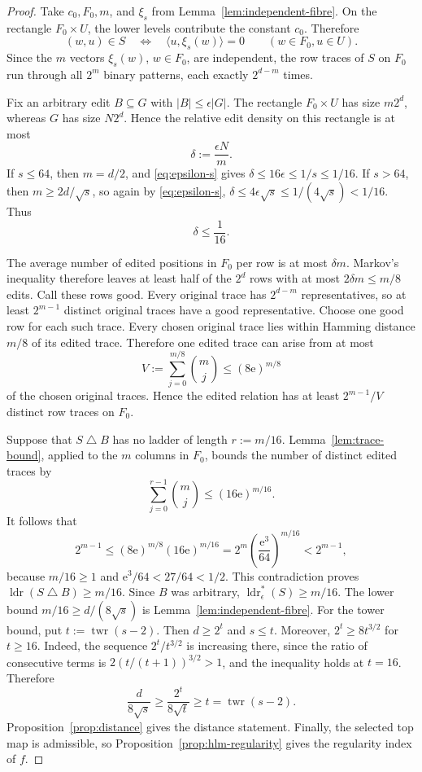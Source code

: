 \documentclass[10pt,a4paper]{amsart}
\numberwithin{theorem}{section}
\newcommand{\inner}[2]{\langle #1,#2\rangle}
\newcommand{\abs}[1]{\lvert #1\rvert}
\newcommand{\twr}{\operatorname{twr}}
\newcommand{\ldr}{\operatorname{ldr}}
\newcommand{\ldrs}{\operatorname{ldr}^{*}}
\newcommand{\econst}{\mathrm e}
\begin{document}
\begin{proof}
Take $c_0,F_0,m$, and $\xi_s$ from Lemma~\ref{lem:independent-fibre}.  On the
rectangle $F_0\times U$, the lower levels contribute the constant $c_0$.
Therefore
\begin{equation}\label{eq:threshold-rectangle}
  (w,u)\in S
  \quad\Longleftrightarrow\quad
  \inner{u}{\xi_s(w)}=0
  \qquad(w\in F_0,u\in U).
\end{equation}
Since the $m$ vectors $\xi_s(w)$, $w\in F_0$, are independent, the row traces
of $S$ on $F_0$ run through all $2^m$ binary patterns, each exactly
$2^{d-m}$ times.

Fix an arbitrary edit $B\subseteq G$ with $\abs B\le\epsilon\abs G$.
The rectangle $F_0\times U$ has size $m2^d$, whereas $G$ has size
$N2^d$.  Hence the relative edit density on this rectangle is at most
\[
  \delta:=\frac{\epsilon N}{m}.
\]
If $s\le64$, then $m=d/2$, and \eqref{eq:epsilon-s} gives
$\delta\le16\epsilon\le1/s\le1/16$.  If $s>64$, then
$m\ge2d/\sqrt{s}$, so again by \eqref{eq:epsilon-s},
$\delta\le4\epsilon\sqrt{s}\le1/(4\sqrt{s})<1/16$.  Thus
\begin{equation}\label{eq:local-edit}
  \delta\le\frac1{16}.
\end{equation}

The average number of edited positions in $F_0$ per row is at most
$\delta m$.  Markov's inequality therefore leaves at least half of the
$2^d$ rows with at most $2\delta m\le m/8$ edits.  Call these rows good.  Every original
trace has $2^{d-m}$ representatives, so at least $2^{m-1}$ distinct original
traces have a good representative.  Choose one good row for each such trace.
Every chosen original trace lies within Hamming distance $m/8$ of its
edited trace.  Therefore one edited trace can arise from at most
\[
  V:=\sum_{j=0}^{m/8}\binom mj
  \le(8\econst)^{m/8}
\]
of the chosen original traces.  Hence the edited relation has at least
$2^{m-1}/V$ distinct row traces on $F_0$.

Suppose that $S\mathbin\triangle B$ has no ladder of length $r:=m/16$.
Lemma~\ref{lem:trace-bound}, applied to the $m$ columns in $F_0$, bounds the
number of distinct edited traces by
\[
  \sum_{j=0}^{r-1}\binom mj\le(16\econst)^{m/16}.
\]
It follows that
\[
  2^{m-1}
  \le(8\econst)^{m/8}(16\econst)^{m/16}
  =2^m\left(\frac{\econst^3}{64}\right)^{m/16}
  <2^{m-1},
\]
because $m/16\ge1$ and $\econst^3/64<27/64<1/2$.  This contradiction proves
$\ldr(S\mathbin\triangle B)\ge m/16$.  Since $B$ was arbitrary,
$\ldrs_\epsilon(S)\ge m/16$.  The lower bound
$m/16\ge d/(8\sqrt{s})$ is Lemma~\ref{lem:independent-fibre}.
For the tower bound, put $t:=\twr(s-2)$.  Then $d\ge2^t$ and $s\le t$.
Moreover, $2^t\ge8t^{3/2}$ for $t\ge16$.  Indeed, the sequence
$2^t/t^{3/2}$ is increasing there, since the ratio of consecutive terms is
$2(t/(t+1))^{3/2}>1$, and the inequality holds at $t=16$.
Therefore
\[
  \frac{d}{8\sqrt{s}}\ge\frac{2^t}{8\sqrt t}\ge t=\twr(s-2).
\]
Proposition~\ref{prop:distance} gives the distance statement.  Finally, the
selected top map is admissible, so Proposition~\ref{prop:hlm-regularity}
gives the regularity index of $f$.
\end{proof}
\end{document}
